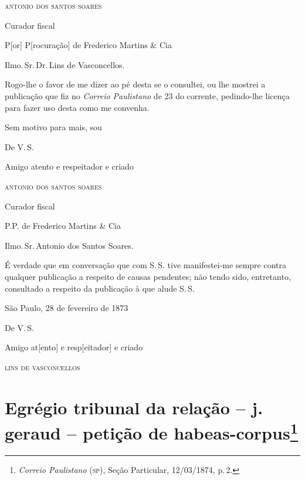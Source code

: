 \begin{flushright}
\textsc{antonio dos santos soares}

Curador fiscal

P{[}or{]} P{[}rocuração{]} de Frederico Martins \& Cia
\end{flushright}

\asterisc

Ilmo.\,Sr.\,Dr.\,Lins de Vasconcellos.

Rogo-lhe o favor de me dizer ao pé desta se o consultei, ou lhe mostrei
a publicação que fiz no \emph{Correio Paulistano} de 23 do corrente,
pedindo-lhe licença para fazer uso desta como me convenha.

\begin{flushright}
Sem motivo para mais, sou

De V.\,S.

Amigo atento e respeitador e criado

\textsc{antonio dos santos soares}

Curador fiscal

P.P. de Frederico Martins \& Cia
\end{flushright}

\asterisc

Ilmo.\,Sr.\,Antonio dos Santos Soares.

É verdade que em conversação que com S.\,S. tive manifestei-me sempre
contra qualquer publicação a respeito de causas pendentes; não tendo
sido, entretanto, consultado a respeito da publicação à que alude S.\,S.

\begin{flushright}
São Paulo, 28 de fevereiro de 1873

De V.\,S.

Amigo at{[}ento{]} e resp{[}eitador{]} e criado

\textsc{lins de vasconcellos}
\end{flushright}

\chapter{Egrégio tribunal da relação -- j. geraud -- petição de habeas-corpus\footnote{\emph{Correio Paulistano} (\textsc{sp}), Seção Particular,
  12/03/1874, p.\,2.}} %

